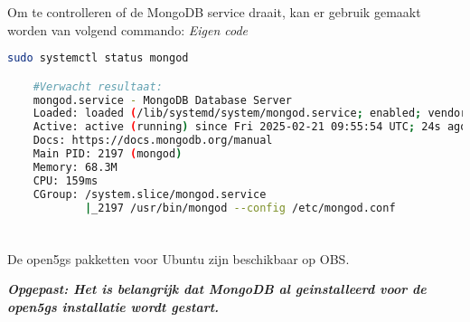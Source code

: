 Om te controlleren of de MongoDB service draait, kan er gebruik gemaakt worden van volgend commando: \textit{Eigen code}



\begin{lstlisting}[language=Bash, caption=Controle MongoDB status]
    sudo systemctl status mongod

    #Verwacht resultaat:
    mongod.service - MongoDB Database Server
    Loaded: loaded (/lib/systemd/system/mongod.service; enabled; vendor pr>
    Active: active (running) since Fri 2025-02-21 09:55:54 UTC; 24s ago
    Docs: https://docs.mongodb.org/manual
    Main PID: 2197 (mongod)
    Memory: 68.3M
    CPU: 159ms
    CGroup: /system.slice/mongod.service
            |_2197 /usr/bin/mongod --config /etc/mongod.conf
\end{lstlisting}

\section{}

De \gls{open5gs} pakketten voor Ubuntu zijn beschikbaar op OBS. 

\textit{\textbf{Opgepast: Het is belangrijk dat MongoDB al geinstalleerd voor de \gls{open5gs} installatie wordt gestart.}} \autocite{Lee2025a}


    
